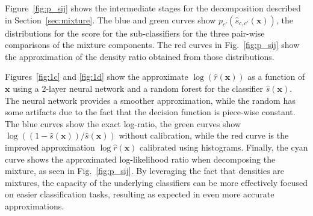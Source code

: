 \documentclass[12pt]{article}
\numberwithin{equation}{section}
\theoremstyle{plain}
\begin{document}
Figure~\ref{fig:p_sij} shows the intermediate stages for the decomposition described in Section~\ref{sec:mixture}.
The blue and green curves show $p_{c'}(\hat{s}_{c,c'}(\mathbf{x}))$,  the distributions for the score for the sub-classifiers for the three pair-wise comparisons of the mixture components. The red curves in Fig.~\ref{fig:p_sij} show the approximation of the density ratio obtained from those distributions.


Figures~\ref{fig:1c} and \ref{fig:1d} show the approximate $\log \left( \hat{r}(\mathbf{x}) \right)$ as a function of $\mathbf{x}$ using a
2-layer neural network and a random forest for the classifier $\hat{s}(\mathbf{x})$.
The neural network provides a smoother approximation, while the random has some artifacts due to the fact that the
decision function is piece-wise constant.
The blue curves show the exact log-ratio, the green curves show
$\log \left( (1-\hat s(\mathbf{x}))/\hat s(\mathbf{x}) \right)$
without calibration, while the red curve is the improved approximation $\log \hat{r}(\mathbf{x})$ calibrated
using histograms. Finally, the cyan curve shows the approximated log-likelihood ratio when decomposing the mixture, as
seen in Fig.~\ref{fig:p_sij}.  By leveraging the fact that densities are mixtures, the capacity
of the underlying classifiers can be more effectively focused on easier classification tasks,
resulting as expected in even more accurate approximations.
\end{document}
